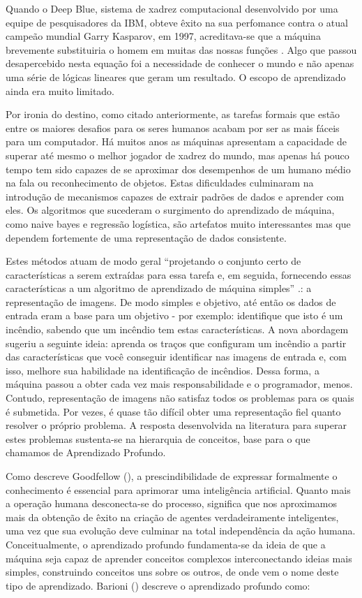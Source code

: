 \documentclass[tcc2]{uftex}
\begin{document}
Quando o Deep Blue, sistema de xadrez computacional desenvolvido por uma equipe de pesquisadores da IBM, obteve êxito na sua perfomance contra o atual campeão mundial Garry Kasparov, em 1997, acreditava-se que a máquina brevemente substituiria o homem em muitas das nossas funções \cite{deepblue02}. Algo que passou desapercebido nesta equação foi a necessidade de conhecer o mundo e não apenas uma série de lógicas lineares que geram um resultado. O escopo de aprendizado ainda era muito limitado.

Por ironia do destino, como citado anteriormente, as tarefas formais que estão entre os maiores desafios para os seres humanos acabam por ser as mais fáceis para um computador. Há muitos anos as máquinas apresentam a capacidade de superar até mesmo o melhor jogador de xadrez do mundo, mas apenas há pouco tempo tem sido capazes de se aproximar dos desempenhos de um humano médio na fala ou reconhecimento de objetos. Estas dificuldades culminaram na introdução de mecanismos capazes de extrair padrões de dados e aprender com eles. Os algoritmos que sucederam o surgimento do aprendizado de máquina, como naive bayes e regressão logística, são artefatos muito interessantes mas que dependem fortemente de uma representação de dados consistente.

Estes métodos atuam de modo geral ``projetando o conjunto certo de características a serem extraídas para essa tarefa e, em seguida, fornecendo essas características a um algoritmo de aprendizado de máquina simples'' \cite[p.3]{goodfellow16}.: a representação de imagens. De modo simples e objetivo, até então os dados de entrada eram a base para um objetivo - por exemplo: identifique que isto é um incêndio, sabendo que um incêndio tem estas características. A nova abordagem sugeriu a seguinte ideia: aprenda os traços que configuram um incêndio a partir das características que você conseguir identificar nas imagens de entrada e, com isso, melhore sua habilidade na identificação de incêndios. Dessa forma, a máquina passou a obter cada vez mais responsabilidade e o programador, menos. Contudo, representação de imagens não satisfaz todos os problemas para os quais é submetida. Por vezes, é quase tão difícil obter uma representação fiel quanto resolver o próprio problema. A resposta desenvolvida na literatura para superar estes problemas sustenta-se na hierarquia de conceitos, base para o que chamamos de Aprendizado Profundo.

Como descreve Goodfellow (\citeyear{goodfellow16}), a prescindibilidade de expressar formalmente o conhecimento é essencial para aprimorar uma inteligência artificial. Quanto mais a operação humana desconecta-se do processo, significa que nos aproximamos mais da obtenção de êxito na criação de agentes verdadeiramente inteligentes, uma vez que sua evolução deve culminar na total independência da ação humana. Conceitualmente, o aprendizado profundo fundamenta-se da ideia de que a máquina seja capaz de aprender conceitos complexos interconectando ideias mais simples, construindo conceitos uns sobre os outros, de onde vem o nome deste tipo de aprendizado. Barioni (\citeyear{Barioni17}) descreve o aprendizado profundo como:
\end{document}
